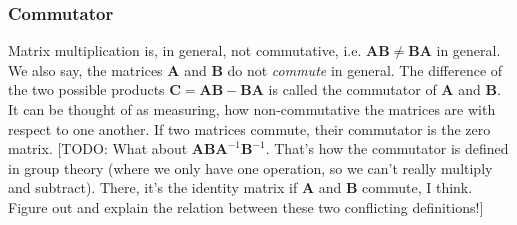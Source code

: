 






\subsubsection{Commutator}
Matrix multiplication is, in general, not commutative, i.e. $\mathbf{A} \mathbf{B} \neq \mathbf{B} \mathbf{A}$ in general. We also say, the matrices  $\mathbf{A}$ and $\mathbf{B}$ do not \emph{commute} in general. The difference of the two possible products $\mathbf{C} = \mathbf{A} \mathbf{B} - \mathbf{B} \mathbf{A}$ is called the commutator of $\mathbf{A}$ and $\mathbf{B}$. It can be thought of as measuring, how non-commutative the matrices are with respect to one another. If two matrices commute, their commutator is the zero matrix. [TODO: What about $\mathbf{A} \mathbf{B} \mathbf{A}^{-1} \mathbf{B}^{-1}$. That's how the commutator is defined in group theory (where we only have one operation, so we can't really multiply and subtract). There, it's the identity matrix if  $\mathbf{A}$ and $\mathbf{B}$ commute, I think. Figure out and explain the relation between these two conflicting definitions!]


